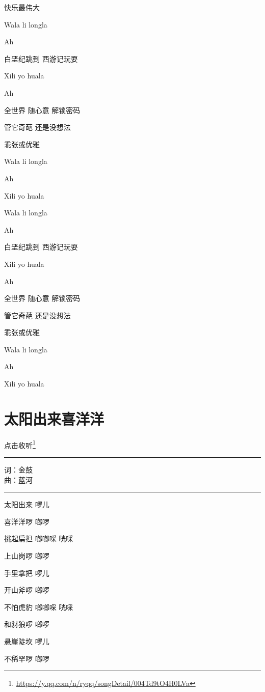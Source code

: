 \documentclass[]{ctexbook}
\renewcommand{\href}[2]{#2\footnote{\url{#1}}}
\begin{document}
快乐最伟大

Wala li longla

Ah

白垩纪跳到 西游记玩耍

Xili yo huala

Ah

全世界 随心意 解锁密码

管它奇葩 还是没想法

乖张或优雅

Wala li longla

Ah

Xili yo huala

Wala li longla

Ah

白垩纪跳到 西游记玩耍

Xili yo huala

Ah

全世界 随心意 解锁密码

管它奇葩 还是没想法

乖张或优雅

Wala li longla

Ah

Xili yo huala

\section*{太阳出来喜洋洋}\label{happy-sun}


\href{https://y.qq.com/n/ryqq/songDetail/004Td9tO4H0LVa}{点击收听}

\begin{center}\rule{0.5\linewidth}{0.5pt}\end{center}

词：金鼓\\
曲：蓝河

\begin{center}\rule{0.5\linewidth}{0.5pt}\end{center}

太阳出来 啰儿

喜洋洋啰 啷啰

挑起扁担 啷啷啋 咣啋

上山岗啰 啷啰

手里拿把 啰儿

开山斧啰 啷啰

不怕虎豹 啷啷啋 咣啋

和豺狼啰 啷啰

悬崖陡坎 啰儿

不稀罕啰 啷啰
\end{document}
